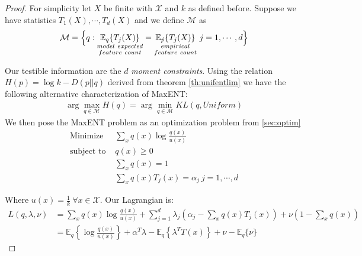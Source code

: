\documentclass[]{article}
\theoremstyle{mattstyle}
\theoremstyle{definition}
\begin{document}
\begin{proof}
	For simplicity let $X$ be finite with $\mathcal{X}$ and $k$ as defined before. Suppose we have statistics $T_1(X), \cdots, T_d(X)$ and we define $\mathcal{M}$ as
	\begin{equation}
	\mathcal{M} = \Bigl\{ q: \underset{\substack{model \ expected \\ feature \ count}}{\mathbb{E}_{q}\{T_j(X)\}} = \underset{\substack{empirical \\ feature \ count}}{\mathbb{E}_{\hat{p}}\{T_j(X)\}} \ j = 1,\cdots,d \Bigr\}
	\end{equation}
	
	Our testible information are the $d$ \emph{moment constraints}. Using the relation \(H(p)=\log k-D(p||q)\) derived from theorem \ref{th:unifentlim} we have the following alternative characterization of MaxENT:
	\begin{align}
	\arg\max\limits_{q \in \mathcal{M}} H(q) = \arg\min\limits_{q \in \mathcal{M}} KL(q, Uniform)
	\end{align}
	We then pose the MaxENT problem as an optimization problem from \ref{sec:optim} 
	\begin{align*}
	\text{Minimize } & \sum_{x}q(x)\log \frac{q(x)}{u(x)} \\
	\text{subject to } & q(x)\ge 0 \\
	& \sum_x q(x) = 1 \\
	& \sum_x q(x)T_j(x) = \alpha_j \ j = 1, \cdots, d
	\end{align*}
	
	Where $u(x) = \frac{1}{k} \ \forall x\in \mathcal{X}$. Our Lagrangian is:
	\begin{align*}
	L(q, \lambda, \nu) &= \sum_{x}q(x)\log \frac{q(x)}{u(x)} + \sum_{j=1}^d \lambda_j \left( \alpha_j - \sum_x q(x)T_j(x) \right) + \nu\left(1 - \sum_x q(x) \right)\\
	&= \mathbb{E}_{q}\left\{ \log \frac{q(x)}{u(x)} \right\} + \alpha^T\lambda - \mathbb{E}_{q}\left\{\lambda^TT(x)\right\} + \nu - \mathbb{E}_{q}\{\nu\}
	\end{align*}
	

\end{proof}
\end{document}
